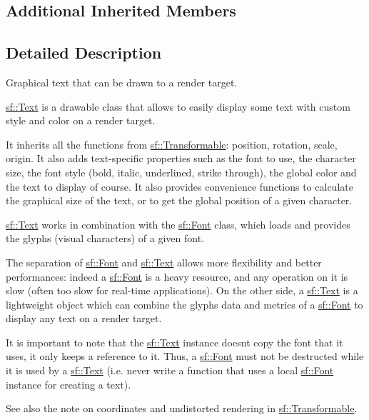 \subsection*{Additional Inherited Members}


\subsection{Detailed Description}
Graphical text that can be drawn to a render target. 

\hyperlink{classsf_1_1_text}{sf\+::\+Text} is a drawable class that allows to easily display some text with custom style and color on a render target.

It inherits all the functions from \hyperlink{classsf_1_1_transformable}{sf\+::\+Transformable}\+: position, rotation, scale, origin. It also adds text-\/specific properties such as the font to use, the character size, the font style (bold, italic, underlined, strike through), the global color and the text to display of course. It also provides convenience functions to calculate the graphical size of the text, or to get the global position of a given character.

\hyperlink{classsf_1_1_text}{sf\+::\+Text} works in combination with the \hyperlink{classsf_1_1_font}{sf\+::\+Font} class, which loads and provides the glyphs (visual characters) of a given font.

The separation of \hyperlink{classsf_1_1_font}{sf\+::\+Font} and \hyperlink{classsf_1_1_text}{sf\+::\+Text} allows more flexibility and better performances\+: indeed a \hyperlink{classsf_1_1_font}{sf\+::\+Font} is a heavy resource, and any operation on it is slow (often too slow for real-\/time applications). On the other side, a \hyperlink{classsf_1_1_text}{sf\+::\+Text} is a lightweight object which can combine the glyphs data and metrics of a \hyperlink{classsf_1_1_font}{sf\+::\+Font} to display any text on a render target.

It is important to note that the \hyperlink{classsf_1_1_text}{sf\+::\+Text} instance doesn\textquotesingle{}t copy the font that it uses, it only keeps a reference to it. Thus, a \hyperlink{classsf_1_1_font}{sf\+::\+Font} must not be destructed while it is used by a \hyperlink{classsf_1_1_text}{sf\+::\+Text} (i.\+e. never write a function that uses a local \hyperlink{classsf_1_1_font}{sf\+::\+Font} instance for creating a text).

See also the note on coordinates and undistorted rendering in \hyperlink{classsf_1_1_transformable}{sf\+::\+Transformable}.

